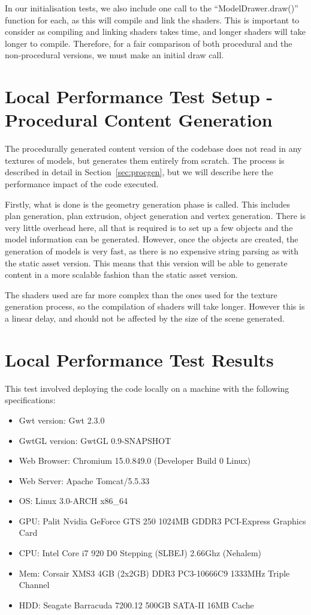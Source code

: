 In our initialisation tests, we also include one call to the ``ModelDrawer.draw()'' function for each, as this will compile and link the shaders.
This is important to consider as compiling and linking shaders takes time, and longer shaders will take longer to compile.
Therefore, for a fair comparison of both procedural and the non-procedural versions, we must make an initial draw call.

\section{Local Performance Test Setup - Procedural Content Generation}
The procedurally generated content version of the codebase does not read in any textures of models, but generates them entirely from scratch.
The process is described in detail in Section~\ref{sec:procgen}, but we will describe here the performance impact of the code executed.

Firstly, what is done is the geometry generation phase is called.
This includes plan generation, plan extrusion, object generation and vertex generation.
There is very little overhead here, all that is required is to set up a few objects and the model information can be generated.
However, once the objects are created, the generation of models is very fast, as there is no expensive string parsing as with the static asset version.
This means that this version will be able to generate content in a more scalable fashion than the static asset version.

The shaders used are far more complex than the ones used for the texture generation process, so the compilation of shaders will take longer.
However this is a linear delay, and should not be affected by the size of the scene generated.

\section{Local Performance Test Results}
This test involved deploying the code locally on a machine with the following specifications:

\begin{itemize}
	\item Gwt version: Gwt 2.3.0
	\item GwtGL version: GwtGL 0.9-SNAPSHOT
	\item Web Browser: Chromium 15.0.849.0 (Developer Build 0 Linux)
	\item Web Server: Apache Tomcat/5.5.33
	\item OS: Linux 3.0-ARCH x86\_64
	\item GPU: Palit Nvidia GeForce GTS 250 1024MB GDDR3 PCI-Express Graphics Card
	\item CPU: Intel Core i7 920 D0 Stepping (SLBEJ) 2.66Ghz (Nehalem)
	\item Mem: Corsair XMS3 4GB (2x2GB) DDR3 PC3-10666C9 1333MHz Triple Channel
	\item HDD: Seagate Barracuda 7200.12 500GB SATA-II 16MB Cache
\end{itemize}

